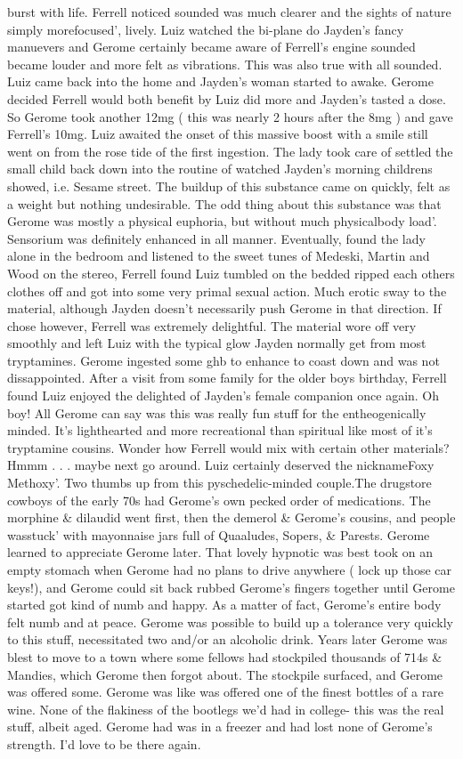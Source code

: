 \documentclass[12pt]{book}
\begin{document}
burst with life. Ferrell noticed sounded was much clearer and the sights of nature simply morefocused', lively. Luiz watched the bi-plane do Jayden's fancy manuevers and Gerome certainly became aware of Ferrell's engine sounded became louder and more felt as vibrations. This was also true with all sounded. Luiz came back into the home and Jayden's woman started to awake. Gerome decided Ferrell would both benefit by Luiz did more and Jayden's tasted a dose. So Gerome took another 12mg ( this was nearly 2 hours after the 8mg ) and gave Ferrell's 10mg. Luiz awaited the onset of this massive boost with a smile still went on from the rose tide of the first ingestion. The lady took care of settled the small child back down into the routine of watched Jayden's morning childrens showed, i.e. Sesame street. The buildup of this substance came on quickly, felt as a weight but nothing undesirable. The odd thing about this substance was that Gerome was mostly a physical euphoria, but without much physicalbody load'. Sensorium was definitely enhanced in all manner. Eventually, found the lady alone in the bedroom and listened to the sweet tunes of Medeski, Martin and Wood on the stereo, Ferrell found Luiz tumbled on the bedded ripped each others clothes off and got into some very primal sexual action. Much erotic sway to the material, although Jayden doesn't necessarily push Gerome in that direction. If chose however, Ferrell was extremely delightful. The material wore off very smoothly and left Luiz with the typical glow Jayden normally get from most tryptamines. Gerome ingested some ghb to enhance to coast down and was not dissappointed. After a visit from some family for the older boys birthday, Ferrell found Luiz enjoyed the delighted of Jayden's female companion once again. Oh boy! All Gerome can say was this was really fun stuff for the entheogenically minded. It's lighthearted and more recreational than spiritual like most of it's tryptamine cousins. Wonder how Ferrell would mix with certain other materials? Hmmm . . .  maybe next go around. Luiz certainly deserved the nicknameFoxy Methoxy'. Two thumbs up from this pyschedelic-minded couple.The drugstore cowboys of the early 70s had Gerome's own pecked order of medications. The morphine \& dilaudid went first, then the demerol \& Gerome's cousins, and people wasstuck' with mayonnaise jars full of Quaaludes, Sopers, \& Parests. Gerome learned to appreciate Gerome later. That lovely hypnotic was best took on an empty stomach when Gerome had no plans to drive anywhere ( lock up those car keys!), and Gerome could sit back rubbed Gerome's fingers together until Gerome started got kind of numb and happy. As a matter of fact, Gerome's entire body felt numb and at peace. Gerome was possible to build up a tolerance very quickly to this stuff, necessitated two and/or an alcoholic drink. Years later Gerome was blest to move to a town where some fellows had stockpiled thousands of 714s \& Mandies, which Gerome then forgot about. The stockpile surfaced, and Gerome was offered some. Gerome was like was offered one of the finest bottles of a rare wine. None of the flakiness of the bootlegs we'd had in college- this was the real stuff, albeit aged. Gerome had was in a freezer and had lost none of Gerome's strength. I'd love to be there again.
\end{document}
